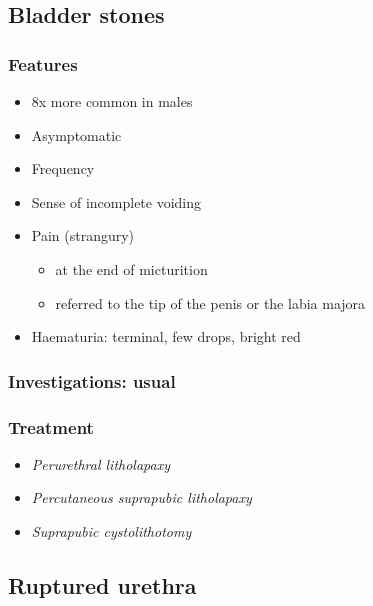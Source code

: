 \documentclass[
  14pt,
]{extarticle}
\providecommand{\tightlist}{%
  \setlength{\itemsep}{0pt}\setlength{\parskip}{0pt}}
\begin{document}
\pagebreak

\hypertarget{bladder-stones}{%
\subsection{Bladder stones}\label{bladder-stones}}

\hypertarget{features-4}{%
\subsubsection{Features}\label{features-4}}

\begin{itemize}
\tightlist
\item
  8x more common in males
\item
  Asymptomatic
\item
  Frequency
\item
  Sense of incomplete voiding
\item
  Pain (strangury)

  \begin{itemize}
  \tightlist
  \item
    at the end of micturition
  \item
    referred to the tip of the penis or the labia majora
  \end{itemize}
\item
  Haematuria: terminal, few drops, bright red
\end{itemize}

\hypertarget{investigations-usual}{%
\subsubsection{Investigations: usual}\label{investigations-usual}}

\hypertarget{treatment-5}{%
\subsubsection{Treatment}\label{treatment-5}}

\begin{itemize}
\item
  \emph{Perurethral litholapaxy}
\item
  \emph{Percutaneous suprapubic litholapaxy}
\item
  \emph{Suprapubic cystolithotomy}
\end{itemize}

\pagebreak

\hypertarget{ruptured-urethra}{%
\subsection{Ruptured urethra}\label{ruptured-urethra}}
\end{document}
